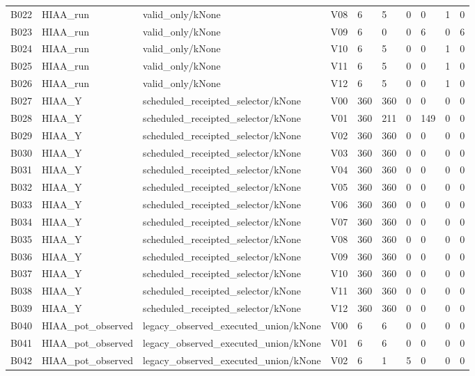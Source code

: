 \begin{longtable}{llllllllll}
B022 & HIAA\_run & valid\_only/kNone & V08 & 6 & 5 & 0 & 0 & 1 & 0 \\
B023 & HIAA\_run & valid\_only/kNone & V09 & 6 & 0 & 0 & 6 & 0 & 6 \\
B024 & HIAA\_run & valid\_only/kNone & V10 & 6 & 5 & 0 & 0 & 1 & 0 \\
B025 & HIAA\_run & valid\_only/kNone & V11 & 6 & 5 & 0 & 0 & 1 & 0 \\
B026 & HIAA\_run & valid\_only/kNone & V12 & 6 & 5 & 0 & 0 & 1 & 0 \\
B027 & HIAA\_Y & scheduled\_receipted\_selector/kNone & V00 & 360 & 360 & 0 & 0 & 0 & 0 \\
B028 & HIAA\_Y & scheduled\_receipted\_selector/kNone & V01 & 360 & 211 & 0 & 149 & 0 & 0 \\
B029 & HIAA\_Y & scheduled\_receipted\_selector/kNone & V02 & 360 & 360 & 0 & 0 & 0 & 0 \\
B030 & HIAA\_Y & scheduled\_receipted\_selector/kNone & V03 & 360 & 360 & 0 & 0 & 0 & 0 \\
B031 & HIAA\_Y & scheduled\_receipted\_selector/kNone & V04 & 360 & 360 & 0 & 0 & 0 & 0 \\
B032 & HIAA\_Y & scheduled\_receipted\_selector/kNone & V05 & 360 & 360 & 0 & 0 & 0 & 0 \\
B033 & HIAA\_Y & scheduled\_receipted\_selector/kNone & V06 & 360 & 360 & 0 & 0 & 0 & 0 \\
B034 & HIAA\_Y & scheduled\_receipted\_selector/kNone & V07 & 360 & 360 & 0 & 0 & 0 & 0 \\
B035 & HIAA\_Y & scheduled\_receipted\_selector/kNone & V08 & 360 & 360 & 0 & 0 & 0 & 0 \\
B036 & HIAA\_Y & scheduled\_receipted\_selector/kNone & V09 & 360 & 360 & 0 & 0 & 0 & 0 \\
B037 & HIAA\_Y & scheduled\_receipted\_selector/kNone & V10 & 360 & 360 & 0 & 0 & 0 & 0 \\
B038 & HIAA\_Y & scheduled\_receipted\_selector/kNone & V11 & 360 & 360 & 0 & 0 & 0 & 0 \\
B039 & HIAA\_Y & scheduled\_receipted\_selector/kNone & V12 & 360 & 360 & 0 & 0 & 0 & 0 \\
B040 & HIAA\_pot\_observed & legacy\_observed\_executed\_union/kNone & V00 & 6 & 6 & 0 & 0 & 0 & 0 \\
B041 & HIAA\_pot\_observed & legacy\_observed\_executed\_union/kNone & V01 & 6 & 6 & 0 & 0 & 0 & 0 \\
B042 & HIAA\_pot\_observed & legacy\_observed\_executed\_union/kNone & V02 & 6 & 1 & 5 & 0 & 0 & 0 \\

\end{longtable}
